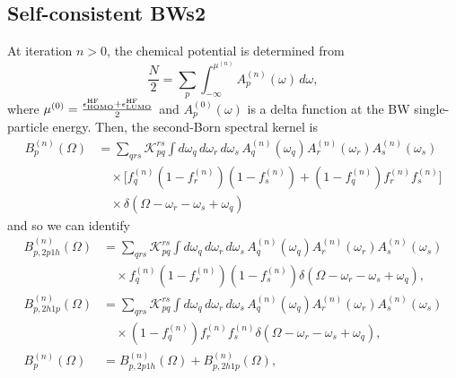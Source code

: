 \subsection{Self-consistent BWs2 }
At iteration $n>0$, the chemical potential is determined from
\begin{equation}
\frac{N}{2}
=
\sum_p
\int_{-\infty}^{\mu^{(n)}} 
A_p^{(n)}(\omega)\,d\omega,
\end{equation}
where $\mu^{(0)}=\frac{\epsilon^{\rm HF}_{\rm HOMO}+\epsilon^{\rm HF}_{\rm LUMO}}{2}$ and $A_p^{(0)}(\omega)$ is a delta function at the BW single-particle energy. Then, the second-Born spectral kernel is
\begin{align}
B_p^{(n)}(\Omega)
&=
\sum_{qrs}
\mathcal{K}_{pq}^{rs}
\int
d\omega_q\,d\omega_r\,d\omega_s\,
A_q^{(n)}(\omega_q)
A_r^{(n)}(\omega_r)
A_s^{(n)}(\omega_s)
\nonumber\\
&\quad\times
\Big[
f_q^{(n)}
(1-f_r^{(n)})
(1-f_s^{(n)})
+
(1-f_q^{(n)})
f_r^{(n)}
f_s^{(n)}
\Big]
\nonumber\\
&\quad\times
\delta(
\Omega-\omega_r-\omega_s+\omega_q)
\end{align}
and so we can identify 
\begin{align}
B_{p,2p1h}^{(n)}(\Omega)
&=
\sum_{qrs}\mathcal K_{pq}^{rs}
\int d\omega_q\,d\omega_r\,d\omega_s\,
A_q^{(n)}(\omega_q)
A_r^{(n)}(\omega_r)
A_s^{(n)}(\omega_s)
\nonumber\\
&\quad\times
f_q^{(n)}
\left(1-f_r^{(n)}\right)
\left(1-f_s^{(n)}\right)
\delta\!\left(
\Omega-\omega_r-\omega_s+\omega_q
\right),
\\[2mm]
B_{p,2h1p}^{(n)}(\Omega)
&=
\sum_{qrs}\mathcal K_{pq}^{rs}
\int d\omega_q\,d\omega_r\,d\omega_s\,
A_q^{(n)}(\omega_q)
A_r^{(n)}(\omega_r)
A_s^{(n)}(\omega_s)
\nonumber\\
&\quad\times
\left(1-f_q^{(n)}\right)
f_r^{(n)}
f_s^{(n)}
\delta\!\left(
\Omega-\omega_r-\omega_s+\omega_q
\right),
\\
B_p^{(n)}(\Omega)
&=
B_{p,2p1h}^{(n)}(\Omega)
+
B_{p,2h1p}^{(n)}(\Omega),
\end{align}
